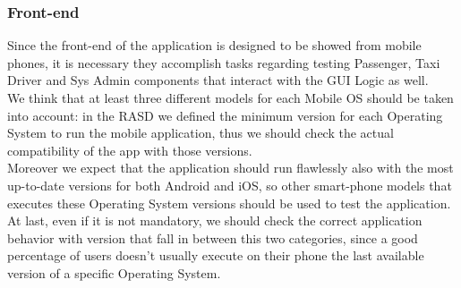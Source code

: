 \subsubsection{Front-end}
Since the front-end of the application is designed to be showed from mobile phones, it is necessary they accomplish tasks regarding testing Passenger, Taxi Driver and Sys Admin components that interact with the GUI Logic as well. \\
We think that at least three different models for each Mobile OS should be taken into account: in the RASD we defined the minimum version for each Operating System to run the mobile application, thus we should check the actual compatibility of the app with those versions.\\
Moreover we expect that the application should run flawlessly also with the most up-to-date versions for both Android and iOS, so other smart-phone models that executes these Operating System versions should be used to test the application. \\ At last, even if it is not mandatory, we should check the correct application behavior with version that fall in between this two categories, since a good percentage of users doesn't usually execute on their phone the last available version of a specific Operating System.